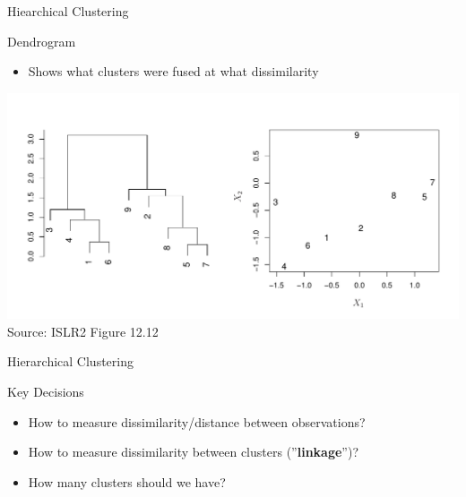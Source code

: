 \documentclass[ignorenonframetext,xcolor=x11names]{beamer}
\begin{document}
\begin{frame}{Hiearchical Clustering}
\begin{block}{Dendrogram}
\begin{itemize}
  \item Shows what clusters were fused at what dissimilarity
\end{itemize}
\end{block}
\centering
\includegraphics[width=\textwidth]{../class11/Figures_Chapters_7-13/Chapter12/12_12.pdf} \\

\scriptsize Source: ISLR2 Figure 12.12
\end{frame}

\begin{frame}{Hierarchical Clustering}
\begin{block}{Key Decisions}
\begin{itemize}
   \item How to measure dissimilarity/distance between observations?
   \item How to measure dissimilarity between clusters (''\textbf{linkage}'')?
   \item How many clusters should we have?
\end{itemize}
\end{block}
\end{frame}
\end{document}
